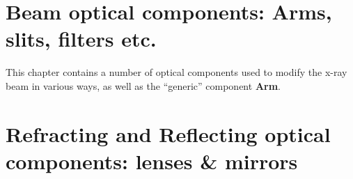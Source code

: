
\chapter{Beam optical components:
Arms, slits, filters etc.}
This chapter contains a number of optical components
used to modify the x-ray beam in various ways,
as well as the ``generic'' component \textbf{Arm}.













\newpage
\chapter{Refracting and Reflecting optical components: lenses \& mirrors}
















